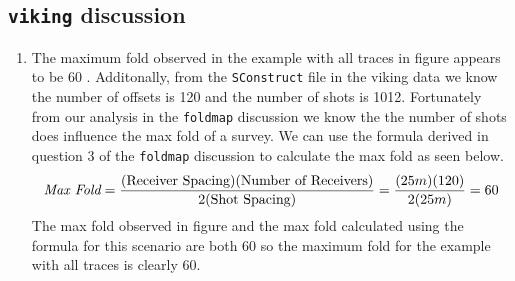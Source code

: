 \subsection{\texttt{viking} discussion}
\begin{enumerate}

\item The maximum fold observed in the example with all traces in figure appears to be 60 . Additonally, from the \texttt{SConstruct} file in the viking data we know the number of offsets is 120 and the number of shots is 1012. Fortunately from our analysis in the \texttt{foldmap} discussion we know the the number of shots does influence the max fold of a survey. We can use the formula derived in question 3 of the \texttt{foldmap} discussion to calculate the max fold as seen below.
\begin{align*}
\emph{Max Fold} = \frac{(\textrm{Receiver Spacing})(\textrm{Number of Receivers})}{2(\textrm{Shot Spacing})} = \frac{(25 m)(120)}{2(25 m)} = 60
\end{align*}
The max fold observed in figure  and the max fold calculated using the formula for this scenario are both 60 so the maximum fold for the example with all traces is clearly 60.


\end{enumerate}
